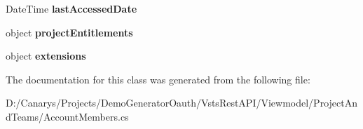 \begin{DoxyCompactItemize}
Date\+Time {\bfseries last\+Accessed\+Date}
\item 
\mbox{\label{class_vsts_rest_a_p_i_1_1_viewmodel_1_1_project_and_teams_1_1_account_members_1_1_value_a47618fc1fe3e1be8438a4ffbe216d589}} 
object {\bfseries project\+Entitlements}
\item 
\mbox{\label{class_vsts_rest_a_p_i_1_1_viewmodel_1_1_project_and_teams_1_1_account_members_1_1_value_aca66fd1518971dd92f632efe911a97fb}} 
object {\bfseries extensions}
\end{DoxyCompactItemize}


The documentation for this class was generated from the following file\+:\begin{DoxyCompactItemize}
\item 
D\+:/\+Canarys/\+Projects/\+Demo\+Generator\+Oauth/\+Vsts\+Rest\+A\+P\+I/\+Viewmodel/\+Project\+And\+Teams/Account\+Members.\+cs\end{DoxyCompactItemize}
